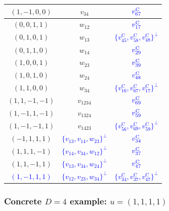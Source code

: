 \documentclass[%
  reprint,
  superscriptaddress,
  showkeys,
  amsmath,amssymb,
  aps,pra,
  longbibliography,
  floatfix,
  x11names
]{revtex4-2}
\DeclareRobustCommand{\chg}[1]{\textcolor{blue}{#1}}
\begin{document}
\begin{table}[ht]
\begin{ruledtabular}
\begin{tabular}{ccc}
$(1,-1,0,0)$ & $v_{34}$ & $\chg{v^{\mathrm{C}}_{67}}$ \\
\hline
$(0,0,1,1)$ & $w_{12}$ & $\chg{v^{\mathrm{C}}_{17}}$ \\
$(0,1,0,1)$ & $w_{13}$ & \chg{$\{v^{\mathrm{C}}_{45}, v^{\mathrm{C}}_{58}, v^{\mathrm{C}}_{48}\}^\perp$} \\
$(0,1,1,0)$ & $w_{14}$ & $\chg{v^{\mathrm{C}}_{29}}$ \\
$(1,0,0,1)$ & $w_{23}$ & $\chg{v^{\mathrm{C}}_{39}}$ \\
$(1,0,1,0)$ & $w_{24}$ & $\chg{v^{\mathrm{C}}_{48}}$ \\
$(1,1,0,0)$ & $w_{34}$ & \chg{$\{v^{\mathrm{C}}_{16}, v^{\mathrm{C}}_{67}, v^{\mathrm{C}}_{17}\}^\perp$} \\
\hline
$(1,1,-1,-1)$ & $v_{1234}$ & $\chg{v^{\mathrm{C}}_{69}}$ \\
$(1,-1,1,-1)$ & $v_{1324}$ & $\chg{v^{\mathrm{C}}_{59}}$ \\
$(1,-1,-1,1)$ & $v_{1423}$ & \chg{$\{v^{\mathrm{C}}_{56}, v^{\mathrm{C}}_{69}, v^{\mathrm{C}}_{59}\}^\perp$} \\
\hline
$(-1,1,1,1)$ & \chg{$\{v_{13}, v_{14}, w_{23}\}^\perp$} & $\chg{v^{\mathrm{C}}_{34}}$ \\
$(1,1,1,-1)$ & \chg{$\{v_{14}, v_{34}, w_{12}\}^\perp$} & $\chg{v^{\mathrm{C}}_{37}}$ \\
$(1,1,-1,1)$ & \chg{$\{v_{13}, v_{34}, w_{24}\}^\perp$} & $\chg{v^{\mathrm{C}}_{47}}$ \\
\hline
\chg{$(1,-1,1,1)$} & \chg{$\{v_{12}, v_{23}, w_{34}\}^\perp$} & \chg{$\{v^{\mathrm{C}}_{34}, v^{\mathrm{C}}_{37}, v^{\mathrm{C}}_{47}\}^\perp$} \\
\end{tabular}
\end{ruledtabular}
\end{table}





\subsubsection{Concrete \texorpdfstring{$D=4$}{D=4} example: \texorpdfstring{$u=(1,1,1,1)$}{u=(1,1,1,1)}}
\end{document}
